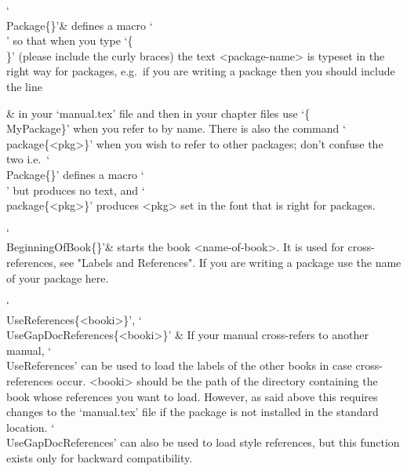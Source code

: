 

\indextt{\\Package}
`\\Package\{<package-name>\}'&
defines   a   macro   `\\<package-name>'   so   that   when   you    type
`\{\\<package-name>\}'  (please  include  the  curly  braces)  the   text
<package-name> is typeset in the right way for {\GAP}  packages,  e.g.~if
you are writing a package  then you should include the
line


  &
in  your  `manual.tex'  file  and  then  in  your   chapter   files   use
`\{\\MyPackage\}' when you refer to  by name. There is
also the command `\\package\{<pkg>\}' when you wish  to  refer  to  other
{\GAP} packages; don't confuse the two i.e.~`\\Package\{<package-name>\}'
defines  a  macro  `\\<package-name>'   but   produces   no   text,   and
`\\package\{<pkg>\}' produces <pkg> set in the font  that  is  right  for
{\GAP} packages.

\indextt{\\BeginningOfBook}
`\\BeginningOfBook\{<name-of-book>\}'&
starts the book <name-of-book>. It  is  used  for  cross-references,  see
"Labels and References". If you are writing a {\GAP} package use the name
of your package here.

\indextt{\\UseReferences}\indextt{\\UseGapDocReferences}
`\\UseReferences\{<booki>\}', `\\UseGapDocReferences\{<booki>\}' &
If your manual cross-refers to another manual, `\\UseReferences'  can  be
used to load the labels of  the  other  books  in  case  cross-references
occur. <booki> should be the path of the directory  containing  the  book
whose references you want to load. However, as said above this requires
changes to the `manual.tex' file if the package is not installed  in  the
standard location. `\\UseGapDocReferences' can also be used to load 
 style references, but this function exists only for backward
compatibility.

